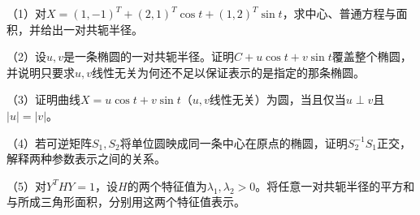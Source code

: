 \begin{exercise}
\mbox{}\par\nobreak

\begin{samepage}
（1）对\(X=(1,-1)^T+(2,1)^T\cos t+(1,2)^T\sin t\)，求中心、普通方程与面积，并给出一对共轭半径。
\par
\end{samepage}

\begin{samepage}
（2）设\(u,v\)是一条椭圆的一对共轭半径。证明\(C+u\cos t+v\sin t\)覆盖整个椭圆，并说明只要求\(u,v\)线性无关为何还不足以保证表示的是指定的那条椭圆。
\par
\end{samepage}

\begin{samepage}
（3）证明曲线\(X=u\cos t+v\sin t\)（\(u,v\)线性无关）为圆，当且仅当\(u\perp v\)且\(|u|=|v|\)。
\par
\end{samepage}

\begin{samepage}
（4）若可逆矩阵\(S_1,S_2\)将单位圆映成同一条中心在原点的椭圆，证明\(S_2^{-1}S_1\)正交，解释两种参数表示之间的关系。
\par
\end{samepage}

\begin{samepage}
（5）对\(Y^THY=1\)，设\(H\)的两个特征值为\(\lambda_1,\lambda_2>0\)。将任意一对共轭半径的平方和与所成三角形面积，分别用这两个特征值表示。
\par
\end{samepage}

\end{exercise}
